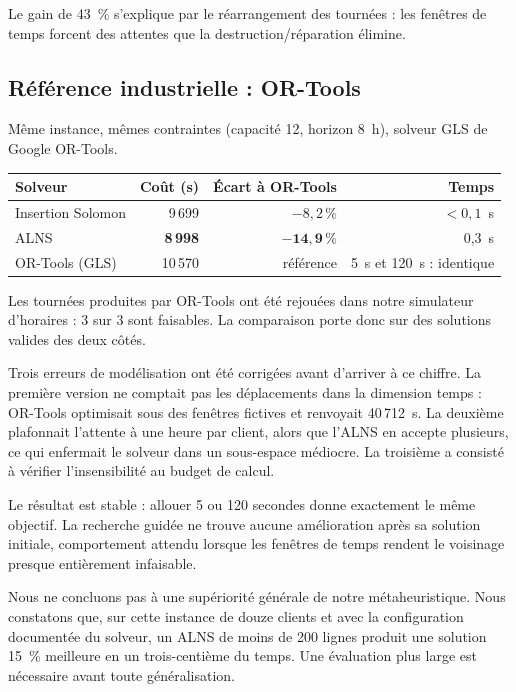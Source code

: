 \documentclass[11pt,a4paper]{article}
\begin{document}
Le gain de 43~\% s'explique par le réarrangement des tournées : les fenêtres de temps forcent des attentes que la destruction/réparation élimine.

\subsection{Référence industrielle : OR-Tools}

Même instance, mêmes contraintes (capacité 12, horizon 8~h), solveur GLS de Google OR-Tools.

\begin{center}
\small
\begin{tabular}{@{}lrrr@{}}
\toprule
\textbf{Solveur} & \textbf{Coût (s)} & \textbf{Écart à OR-Tools} & \textbf{Temps} \\
\midrule
Insertion Solomon & 9\,699 & $-8{,}2\,\%$ & $<0{,}1$~s \\
ALNS & \textbf{8\,998} & $\mathbf{-14{,}9\,\%}$ & 0,3~s \\
OR-Tools (GLS) & 10\,570 & référence & 5~s et 120~s : identique \\
\bottomrule
\end{tabular}
\end{center}

Les tournées produites par OR-Tools ont été rejouées dans notre simulateur d'horaires : 3 sur 3 sont faisables. La comparaison porte donc sur des solutions valides des deux côtés.

Trois erreurs de modélisation ont été corrigées avant d'arriver à ce chiffre. La première version ne comptait pas les déplacements dans la dimension temps : OR-Tools optimisait sous des fenêtres fictives et renvoyait 40\,712~s. La deuxième plafonnait l'attente à une heure par client, alors que l'ALNS en accepte plusieurs, ce qui enfermait le solveur dans un sous-espace médiocre. La troisième a consisté à vérifier l'insensibilité au budget de calcul.

Le résultat est stable : allouer 5 ou 120 secondes donne exactement le même objectif. La recherche guidée ne trouve aucune amélioration après sa solution initiale, comportement attendu lorsque les fenêtres de temps rendent le voisinage presque entièrement infaisable.

Nous ne concluons pas à une supériorité générale de notre métaheuristique. Nous constatons que, sur cette instance de douze clients et avec la configuration documentée du solveur, un ALNS de moins de 200 lignes produit une solution 15~\% meilleure en un trois-centième du temps. Une évaluation plus large est nécessaire avant toute généralisation.
\end{document}
